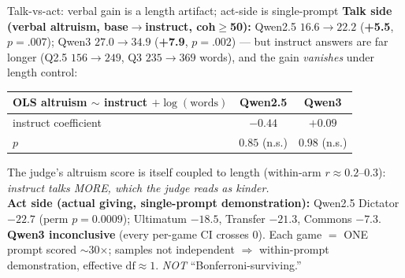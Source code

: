 \documentclass[aspectratio=169,11pt]{beamer}
\begin{document}
\begin{frame}{Talk-vs-act: verbal gain is a length artifact; act-side is single-prompt}
\textbf{Talk side (verbal altruism, base$\to$instruct, coh$\geq$50):} Qwen2.5 $16.6\to22.2$
(\textbf{+5.5}, $p{=}.007$); Qwen3 $27.0\to34.9$ (\textbf{+7.9}, $p{=}.002$) --- but instruct
answers are far longer (Q2.5 $156\to249$, Q3 $235\to369$ words), and the gain \emph{vanishes} under length control:
\begin{center}\footnotesize
\begin{tabular}{lcc}
\toprule
OLS altruism $\sim$ instruct $+ \log(\text{words})$ & Qwen2.5 & Qwen3 \\
\midrule
instruct coefficient & $-0.44$ & $+0.09$ \\
$p$ & $0.85$ (n.s.) & $0.98$ (n.s.) \\
\bottomrule
\end{tabular}
\end{center}
\footnotesize The judge's altruism score is itself coupled to length (within-arm $r\approx0.2$--$0.3$): \emph{instruct talks MORE, which the judge reads as kinder.}\\[3pt]
\normalsize\textbf{Act side (actual giving, single-prompt demonstration):} \footnotesize
Qwen2.5 Dictator $\mathbf{-22.7}$ (perm $p{=}0.0009$); Ultimatum $-18.5$, Transfer $-21.3$, Commons $-7.3$.
\textbf{Qwen3 inconclusive} (every per-game CI crosses 0). Each game $=$ ONE prompt scored $\sim$30$\times$;
samples not independent $\Rightarrow$ within-prompt demonstration, effective $\mathrm{df}\approx 1$. \emph{NOT} ``Bonferroni-surviving.''
\end{frame}
\end{document}
